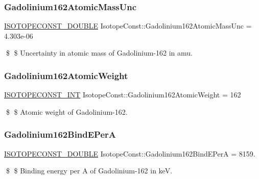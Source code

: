 \subsubsection{\texorpdfstring{Gadolinium162\+Atomic\+Mass\+Unc}{Gadolinium162AtomicMassUnc}}
{\footnotesize\ttfamily \mbox{\hyperlink{group___isotope_const-_macros_ga8f45a7272ce02c0b4c65c44636ed719a}{I\+S\+O\+T\+O\+P\+E\+C\+O\+N\+S\+T\+\_\+\+D\+O\+U\+B\+LE}} Isotope\+Const\+::\+Gadolinium162\+Atomic\+Mass\+Unc = 4.\+303e-\/06}

\$ \$ Uncertainty in atomic mass of Gadolinium-\/162 in amu. \mbox{\label{group___isotope_const-_gadolinium-_gd162_ga804e1b2f01642986f25fda04a8a0f418}} 
\subsubsection{\texorpdfstring{Gadolinium162\+Atomic\+Weight}{Gadolinium162AtomicWeight}}
{\footnotesize\ttfamily \mbox{\hyperlink{group___isotope_const-_macros_ga5f18360b3e99483a35c32d789e62621c}{I\+S\+O\+T\+O\+P\+E\+C\+O\+N\+S\+T\+\_\+\+I\+NT}} Isotope\+Const\+::\+Gadolinium162\+Atomic\+Weight = 162}

\$ \$ Atomic weight of Gadolinium-\/162. \mbox{\label{group___isotope_const-_gadolinium-_gd162_gac125c68469274c9d13043e8af8b9a76f}} 
\subsubsection{\texorpdfstring{Gadolinium162\+Bind\+E\+PerA}{Gadolinium162BindEPerA}}
{\footnotesize\ttfamily \mbox{\hyperlink{group___isotope_const-_macros_ga8f45a7272ce02c0b4c65c44636ed719a}{I\+S\+O\+T\+O\+P\+E\+C\+O\+N\+S\+T\+\_\+\+D\+O\+U\+B\+LE}} Isotope\+Const\+::\+Gadolinium162\+Bind\+E\+PerA = 8159.}

\$ \$ Binding energy per A of Gadolinium-\/162 in keV. \mbox{\label{group___isotope_const-_gadolinium-_gd162_ga108c4e92cdf425b189a256aa14691eef}} 
